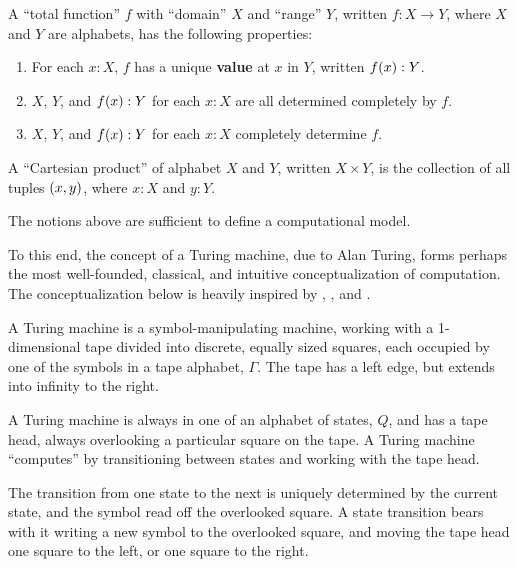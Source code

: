 \begin{notion}

A ``total function'' $f$ with ``domain'' $X$ and ``range'' $Y$, written
$f:X\rightarrow Y$, where $X$ and $Y$ are alphabets, has the following
properties:

\begin{enumerate}

\item For each $x : X$, $f$ has a unique \textbf{value} at $x$ in $Y$, written
$f\mathopen{}\left({x}\right)\mathclose{} : Y$.

\item $X$, $Y$, and $f\mathopen{}\left({x}\right)\mathclose{} : Y$ for each $x : X$ are all determined completely
by $f$.

\item $X$, $Y$, and $f\mathopen{}\left({x}\right)\mathclose{} : Y$ for each $x : X$ completely determine $f$.

\end{enumerate}

\end{notion}

\begin{notion} A ``Cartesian product'' of alphabet $X$ and $Y$, written
$X\times Y$, is the collection of all tuples $\mathopen{}\left({x,y}\right)\mathclose{}$, where $x:X$ and $y:Y$.
\end{notion}

The notions above are sufficient to define a computational model.

To this end, the concept of a Turing machine, due to Alan
Turing\cite{turing-1936-7}, forms perhaps the most well-founded, classical, and
intuitive conceptualization of computation. The conceptualization below is
heavily inspired by \cite{jones-1997}, \cite{homer-selman-2011}, and
\cite{sipser-2013}.

A Turing machine is a symbol-manipulating machine, working with a 1-dimensional
tape divided into discrete, equally sized squares, each occupied by one of the
symbols in a tape alphabet, $\Gamma$. The tape has a left edge, but extends
into infinity to the right.

A Turing machine is always in one of an alphabet of states, $Q$, and has a tape
head, always overlooking a particular square on the tape. A Turing machine
``computes'' by transitioning between states and working with the tape head.

The transition from one state to the next is uniquely determined by the current
state, and the symbol read off the overlooked square. A state transition bears
with it writing a new symbol to the overlooked square, and moving the tape head
one square to the left, or one square to the right.

